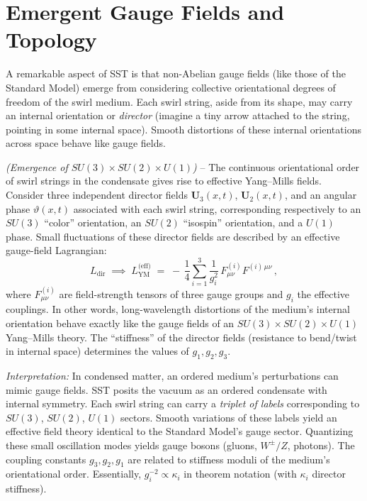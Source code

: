\documentclass[10pt,reprint,aps,onecolumn,nofootinbib]{revtex4-2}
\begin{document}



    \section{Emergent Gauge Fields and Topology}
	A remarkable aspect of SST is that non-Abelian gauge fields (like those of the Standard Model) emerge from considering collective orientational degrees of freedom of the swirl medium. Each swirl string, aside from its shape, may carry an internal orientation or \emph{director} (imagine a tiny arrow attached to the string, pointing in some internal space). Smooth distortions of these internal orientations across space behave like gauge fields.

	\begin{tcolorbox}[title=Theorem 6.1: Emergent Yang–Mills Fields]
		\emph{(Emergence of $SU(3)\times SU(2)\times U(1)$)} – The continuous orientational order of swirl strings in the condensate gives rise to effective Yang–Mills fields. Consider three independent director fields $\mathbf{U}_3(x,t)$, $\mathbf{U}_2(x,t)$, and an angular phase $\vartheta(x,t)$ associated with each swirl string, corresponding respectively to an $SU(3)$ “color” orientation, an $SU(2)$ “isospin” orientation, and a $U(1)$ phase. Small fluctuations of these director fields are described by an effective gauge-field Lagrangian:
		\[
			L_{\text{dir}} \;\implies\; L_{\text{YM}}^{\text{(eff)}} \;=\; -\,\frac{1}{4}\sum_{i=1}^3 \frac{1}{g_i^2}\,F^{(i)}_{\mu\nu} F^{(i)\,\mu\nu}\,,
		\]
		where $F_{\mu\nu}^{(i)}$ are field-strength tensors of three gauge groups and $g_i$ the effective couplings. In other words, long-wavelength distortions of the medium’s internal orientation behave exactly like the gauge fields of an $SU(3)\times SU(2)\times U(1)$ Yang–Mills theory. The “stiffness” of the director fields (resistance to bend/twist in internal space) determines the values of $g_1, g_2, g_3$.
	\end{tcolorbox}

	\noindent \textit{Interpretation:} In condensed matter, an ordered medium’s perturbations can mimic gauge fields. SST posits the vacuum as an ordered condensate with internal symmetry. Each swirl string can carry a \emph{triplet of labels} corresponding to $SU(3)$, $SU(2)$, $U(1)$ sectors. Smooth variations of these labels yield an effective field theory identical to the Standard Model’s gauge sector. Quantizing these small oscillation modes yields gauge bosons (gluons, $W^\pm/Z$, photons). The coupling constants $g_{3}, g_{2}, g_{1}$ are related to stiffness moduli of the medium’s orientational order. Essentially, $g_i^{-2} \propto \kappa_i$ in theorem notation (with $\kappa_i$ director stiffness).
\end{document}
